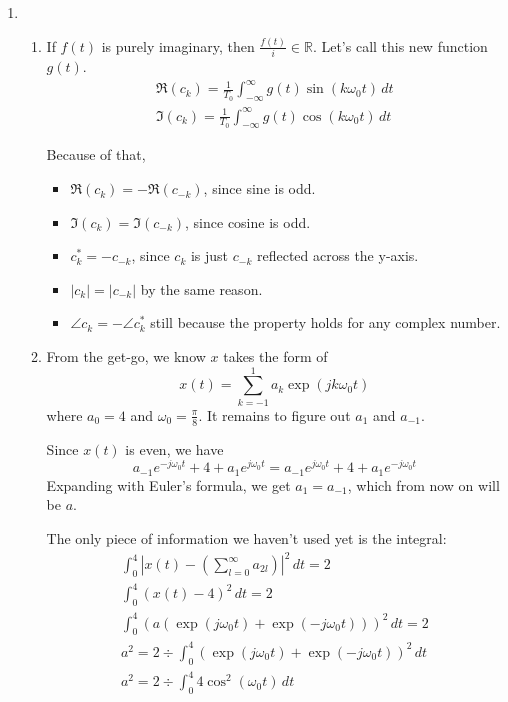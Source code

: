 \documentclass[12pt]{article}
\begin{document}
\begin{enumerate}
      \item \begin{enumerate}
                  \item If $f(t)$ is purely imaginary, then $\frac{f(t)}{i} \in \mathbb{R}$.
                        Let's call this new function $g(t)$.
                        \begin{gather*}
                              \Re(c_k)=\frac{1}{T_0} \int_{-\infty}^{\infty} g(t)\sin(k\omega_0 t)\,dt \\
                              \Im(c_k)=\frac{1}{T_0} \int_{-\infty}^{\infty} g(t)\cos(k\omega_0 t)\,dt
                        \end{gather*}

                        Because of that,
                        \begin{itemize}
                              \item $\Re(c_k)=-\Re(c_{-k})$, since sine is odd.
                              \item $\Im(c_k)=\Im(c_{-k})$, since cosine is odd.
                              \item $c_k^* = -c_{-k}$, since $c_k$ is just $c_{-k}$ reflected across the y-axis.
                              \item $|c_k|=|c_{-k}|$ by the same reason.
                              \item $\angle c_k=- \angle c_k^*$ still because the property holds for any complex number.
                        \end{itemize}
                  \item From the get-go, we know $x$ takes the form of
                        \[x(t)=\sum_{k=-1}^{1} a_k \exp\left(jk\omega_0t\right)\]
                        where $a_0=4$ and $\omega_0=\frac{\pi}{8}$.
                        It remains to figure out $a_1$ and $a_{-1}$.

                        Since $x(t)$ is even, we have
                        \[a_{-1}e^{-j\omega_0t}+4+a_1e^{j\omega_0t}=a_{-1}e^{j\omega_0t}+4+a_1e^{-j\omega_0t}\]
                        Expanding with Euler's formula, we get $a_1=a_{-1}$, which from now on will be $a$.

                        The only piece of information we haven't used yet is the integral:
                        \begin{gather*}
                              \int_{0}^{4} \left|x(t)-\left(\sum_{l=0}^{\infty} a_{2l}\right)\right|^2\,dt  = 2 \\
                              \int_{0}^{4} (x(t)-4)^2\,dt = 2 \\
                              \int_{0}^{4} \left(a(\exp(j\omega_0t)+\exp(-j\omega_0t))\right)^2\,dt = 2 \\
                              a^2=2 \div \int_{0}^{4} \left(\exp(j\omega_0t)+\exp(-j\omega_0t)\right)^2\,dt \\
                              a^2=2 \div \int_{0}^{4} 4\cos^2(\omega_0 t)\,dt
                        \end{gather*}


\end{enumerate}
\end{enumerate}
\end{document}
